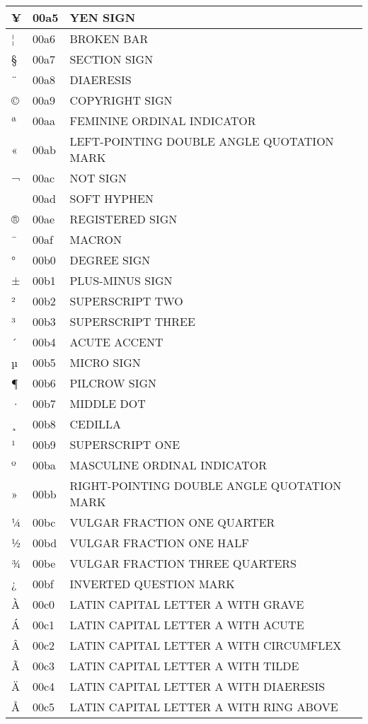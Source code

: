 \documentclass[12pt,letterpaper,openany]{book}
\begin{document}
\begin{center}
\begin{supertabular}{|m{0.25in}|m{0.5in}|m{4in}|}
¥ & 00a5 & YEN SIGN\\\hline
¦ & 00a6 & BROKEN BAR\\\hline
§ & 00a7 & SECTION SIGN\\\hline
¨ & 00a8 & DIAERESIS\\\hline
© & 00a9 & COPYRIGHT SIGN\\\hline
ª & 00aa & FEMININE ORDINAL INDICATOR\\\hline
« & 00ab & LEFT-POINTING DOUBLE ANGLE QUOTATION MARK\\\hline
¬ & 00ac & NOT SIGN\\\hline
­ & 00ad & SOFT HYPHEN\\\hline
® & 00ae & REGISTERED SIGN\\\hline
¯ & 00af & MACRON\\\hline
° & 00b0 & DEGREE SIGN\\\hline
± & 00b1 & PLUS-MINUS SIGN\\\hline
² & 00b2 & SUPERSCRIPT TWO\\\hline
³ & 00b3 & SUPERSCRIPT THREE\\\hline
´ & 00b4 & ACUTE ACCENT\\\hline
µ & 00b5 & MICRO SIGN\\\hline
¶ & 00b6 & PILCROW SIGN\\\hline
· & 00b7 & MIDDLE DOT\\\hline
¸ & 00b8 & CEDILLA\\\hline
¹ & 00b9 & SUPERSCRIPT ONE\\\hline
º & 00ba & MASCULINE ORDINAL INDICATOR\\\hline
» & 00bb & RIGHT-POINTING DOUBLE ANGLE QUOTATION MARK\\\hline
¼ & 00bc & VULGAR FRACTION ONE QUARTER\\\hline
½ & 00bd & VULGAR FRACTION ONE HALF\\\hline
¾ & 00be & VULGAR FRACTION THREE QUARTERS\\\hline
¿ & 00bf & INVERTED QUESTION MARK\\\hline
À & 00c0 & LATIN CAPITAL LETTER A WITH GRAVE\\\hline
Á & 00c1 & LATIN CAPITAL LETTER A WITH ACUTE\\\hline
Â & 00c2 & LATIN CAPITAL LETTER A WITH CIRCUMFLEX\\\hline
Ã & 00c3 & LATIN CAPITAL LETTER A WITH TILDE\\\hline
Ä & 00c4 & LATIN CAPITAL LETTER A WITH DIAERESIS\\\hline
Å & 00c5 & LATIN CAPITAL LETTER A WITH RING ABOVE\\\hline

\end{supertabular}
\end{center}
\end{document}
